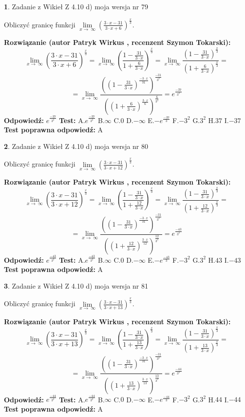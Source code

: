\documentclass[12pt, a4paper]{article}
\theoremstyle{definition} %
\newtheorem{zad}{}
\newcommand{\zadStart}[1]{\begin{zad}#1\newline}
\newcommand{\zadStop}{\end{zad}}
\newcommand{\rozwStart}[2]{\noindent \textbf{Rozwiązanie (autor #1 , recenzent #2): }\newline}
\newcommand{\rozwStop}{\newline}
\newcommand{\odpStart}{\noindent \textbf{Odpowiedź:}\newline}
\newcommand{\odpStop}{\newline}
\newcommand{\testStart}{\noindent \textbf{Test:}\newline}
\newcommand{\testStop}{\newline}
\newcommand{\kluczStart}{\noindent \textbf{Test poprawna odpowiedź:}\newline}
\newcommand{\kluczStop}{\newline}
\begin{document}
\zadStart{Zadanie z Wikieł Z 4.10 d) moja wersja nr 79}


Obliczyć granicę funkcji  $\lim\limits_{x\to\ \infty}(\frac{3\cdot x-31}{3\cdot x+6})^{\frac{x}{3}}$.
\zadStop
\rozwStart{Patryk Wirkus}{Szymon Tokarski}
$$\lim\limits_{x\to\ \infty}(\frac{3\cdot x-31}{3\cdot x+6})^{\frac{x}{3}} = \lim\limits_{x\to\ \infty}(\frac{1-\frac{31}{3\cdot x}}{1+\frac{6}{3\cdot x}})^{\frac{x}{3}}=\lim\limits_{x\to\ \infty}\frac{(1-\frac{31}{3\cdot x})^{\frac{x}{3}}}{(1+\frac{6}{3\cdot x})^{\frac{x}{3}}}=$$
$$=\lim\limits_{x\to\ \infty}\frac{((1-\frac{31}{3\cdot x})^{\frac{-3\cdot x}{31}})^{\frac{-31}{3^{2}}}}{((1+\frac{6}{3\cdot x})^{\frac{3\cdot x}{6}})^{\frac{6}{3^{2}}}}=e^{\frac{-37}{3^{2}}}$$
\rozwStop
\odpStart
$e^{\frac{-37}{3^{2}}}$
\odpStop
\testStart
A.$e^{\frac{-37}{3^{2}}}$ B.$\infty$ C.$0$ D.$-\infty$ E.$-e^{\frac{-37}{3}}$
F.$-3^{2}$ G.$3^{2}$
H.$37$
I.$-37$
\testStop
\kluczStart
A
\kluczStop



\zadStart{Zadanie z Wikieł Z 4.10 d) moja wersja nr 80}


Obliczyć granicę funkcji  $\lim\limits_{x\to\ \infty}(\frac{3\cdot x-31}{3\cdot x+12})^{\frac{x}{3}}$.
\zadStop
\rozwStart{Patryk Wirkus}{Szymon Tokarski}
$$\lim\limits_{x\to\ \infty}(\frac{3\cdot x-31}{3\cdot x+12})^{\frac{x}{3}} = \lim\limits_{x\to\ \infty}(\frac{1-\frac{31}{3\cdot x}}{1+\frac{12}{3\cdot x}})^{\frac{x}{3}}=\lim\limits_{x\to\ \infty}\frac{(1-\frac{31}{3\cdot x})^{\frac{x}{3}}}{(1+\frac{12}{3\cdot x})^{\frac{x}{3}}}=$$
$$=\lim\limits_{x\to\ \infty}\frac{((1-\frac{31}{3\cdot x})^{\frac{-3\cdot x}{31}})^{\frac{-31}{3^{2}}}}{((1+\frac{12}{3\cdot x})^{\frac{3\cdot x}{12}})^{\frac{12}{3^{2}}}}=e^{\frac{-43}{3^{2}}}$$
\rozwStop
\odpStart
$e^{\frac{-43}{3^{2}}}$
\odpStop
\testStart
A.$e^{\frac{-43}{3^{2}}}$ B.$\infty$ C.$0$ D.$-\infty$ E.$-e^{\frac{-43}{3}}$
F.$-3^{2}$ G.$3^{2}$
H.$43$
I.$-43$
\testStop
\kluczStart
A
\kluczStop



\zadStart{Zadanie z Wikieł Z 4.10 d) moja wersja nr 81}


Obliczyć granicę funkcji  $\lim\limits_{x\to\ \infty}(\frac{3\cdot x-31}{3\cdot x+13})^{\frac{x}{3}}$.
\zadStop
\rozwStart{Patryk Wirkus}{Szymon Tokarski}
$$\lim\limits_{x\to\ \infty}(\frac{3\cdot x-31}{3\cdot x+13})^{\frac{x}{3}} = \lim\limits_{x\to\ \infty}(\frac{1-\frac{31}{3\cdot x}}{1+\frac{13}{3\cdot x}})^{\frac{x}{3}}=\lim\limits_{x\to\ \infty}\frac{(1-\frac{31}{3\cdot x})^{\frac{x}{3}}}{(1+\frac{13}{3\cdot x})^{\frac{x}{3}}}=$$
$$=\lim\limits_{x\to\ \infty}\frac{((1-\frac{31}{3\cdot x})^{\frac{-3\cdot x}{31}})^{\frac{-31}{3^{2}}}}{((1+\frac{13}{3\cdot x})^{\frac{3\cdot x}{13}})^{\frac{13}{3^{2}}}}=e^{\frac{-44}{3^{2}}}$$
\rozwStop
\odpStart
$e^{\frac{-44}{3^{2}}}$
\odpStop
\testStart
A.$e^{\frac{-44}{3^{2}}}$ B.$\infty$ C.$0$ D.$-\infty$ E.$-e^{\frac{-44}{3}}$
F.$-3^{2}$ G.$3^{2}$
H.$44$
I.$-44$
\testStop
\kluczStart
A
\kluczStop
\end{document}
